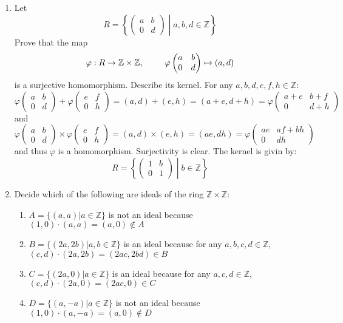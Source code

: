 \documentclass{report}
\newcommand{\Z}{\mathbb{Z}}
\begin{document}
\begin{enumerate}
\begin{enumerate}
    \end{enumerate}
    \item Let 
    $$R=\left\{\begin{pmatrix} a&b\\0&d \end{pmatrix} \middle| a,b,d\in\Z \right\}$$
    Prove that the map
    $$\varphi: R\rightarrow\Z\times\Z, \hspace{25 pt} \varphi \begin{pmatrix} a & b\\0 & d \end{pmatrix}\mapsto (a,d)$$
    is a surjective homomorphism. Describe its kernel.
    For any $a,b,d,e,f,h\in \Z$:
    $$\varphi\begin{pmatrix} a & b\\0 & d \end{pmatrix} + \varphi\begin{pmatrix} e & f\\0 & h \end{pmatrix}=(a,d)+(e,h)=(a+e,d+h)=\varphi\begin{pmatrix} a+e & b+f\\0 & d+h \end{pmatrix}$$
    and
    $$\varphi\begin{pmatrix} a & b\\0 & d \end{pmatrix}\times\varphi\begin{pmatrix} e & f\\0 & h \end{pmatrix}=(a,d)\times(e,h)=(ae,dh)=\varphi\begin{pmatrix} ae & af+bh\\0 & dh \end{pmatrix}$$
    and thus $\varphi$ is a homomorphism. Surjectivity is clear. The kernel is givin by:
    $$R=\left\{\begin{pmatrix} 1&b\\0&1 \end{pmatrix} \middle| b\in\Z \right\}$$
    \item Decide which of the following are ideals of the ring $\Z\times \Z$:
    \begin{enumerate}
        \item $A=\{(a,a)|a\in\Z\}$ is not an ideal because $(1,0)\cdot (a,a)=(a,0)\notin A$
        \item $B=\{(2a,2b)|a,b\in\Z\}$ is an ideal because for any $a,b,c,d\in\Z$, $(c,d)\cdot(2a,2b)=(2ac,2bd)\in B$
        \item $C=\{(2a,0)|a\in\Z\}$ is an ideal because for any $a,c,d\in\Z$, $(c,d)\cdot(2a,0)=(2ac,0)\in C$
        \item $D=\{(a,-a)|a\in\Z\}$ is not an ideal because $(1,0)\cdot (a,-a)=(a,0)\notin D$
    \end{enumerate}


\end{enumerate}
\end{document}
